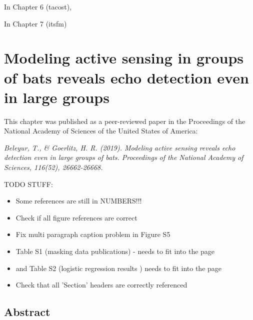 \documentclass[
]{book}
\begin{document}
In Chapter 6 (tacost),

In Chapter 7 (itsfm)

\hypertarget{cpnchapter}{%
\chapter{Modeling active sensing in groups of bats reveals echo detection even in large groups}\label{cpnchapter}}


This chapter was published as a peer-reviewed paper in the Proceedings of the National Academy of Sciences of the United States of America:

\emph{Beleyur, T., \& Goerlitz, H. R. (2019). Modeling active sensing reveals echo detection even in large groups of bats. Proceedings of the National Academy of Sciences, 116(52), 26662-26668.}

TODO STUFF:

\begin{itemize}
\item Some references are still in NUMBERS!!!
\item Check if all figure references are correct
\item Fix multi  paragraph caption problem in Figure S5
\item Table S1 (masking data publications) - needs to fit into the page
\item and Table S2 (logistic regression results ) needs to fit into the page 
\item Check that all 'Section' headers are correctly referenced
\end{itemize}

\newpage

\hypertarget{cpn_abstract}{%
\section*{Abstract}\label{cpn_abstract}}
\end{document}
